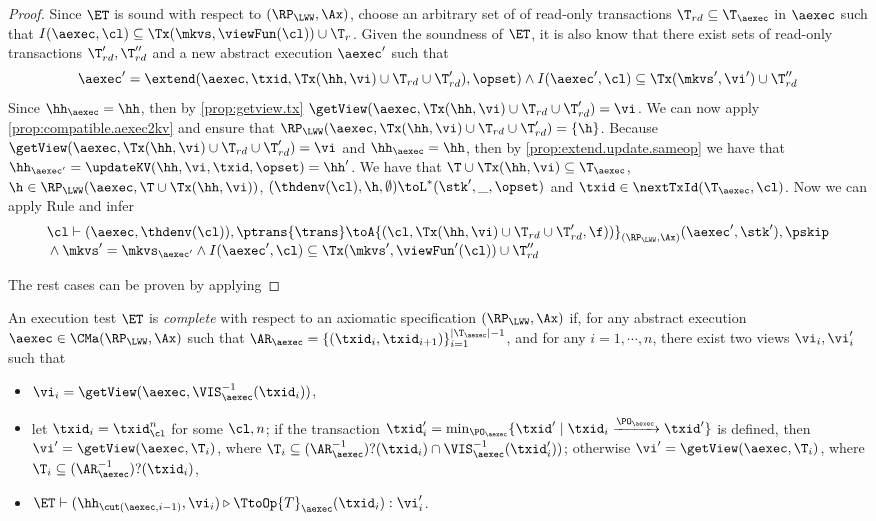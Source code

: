 \begin{proof}
Since \( \ET \) is sound with respect to \( (\RP_{\LWW}, \Ax) \),
choose an arbitrary set of of read-only transactions $\T_{rd} \subseteq \T_{\aexec}$ in \( \aexec \) such that \( I(\aexec, \cl) \subseteq \Tx(\mkvs, \viewFun(\cl)) \cup \T_{r}\).
Given the soundness of \( \ET \), it is also know that there exist sets of read-only transactions  \( \T'_{rd}, \T''_{rd} \) and a new abstract execution \( \aexec' \) such that 
\[
    \aexec' = \extend(\aexec, \txid, \Tx(\hh, \vi) \cup \T_{rd} \cup \T'_{rd} ), \opset)  \land I(\aexec', \cl)  \subseteq  \Tx(\mkvs', \vi') \cup \T''_{rd}
\]
Since $\hh_{\aexec} = \hh$, then by \cref{prop:getview.tx} $\getView(\aexec, \Tx(\hh, \vi) \cup \T_{rd} \cup \T'_{rd}) = \vi$. 
We can now apply \cref{prop:compatible.aexec2kv} and ensure that $\RP_{\LWW}(\aexec, \Tx(\hh, \vi) \cup \T_{rd} \cup \T'_{rd}) = \{\h\}$.
Because $\getView(\aexec, \Tx(\hh, \vi) \cup \T_{rd} \cup \T'_{rd}) = \vi$ and $\hh_{\aexec} = \hh$,
then by \cref{prop:extend.update.sameop} we have that $\hh_{\aexec'} = \updateKV(\hh, \vi, \txid, \opset) = \hh'$. 
We  have that $\T \cup \Tx(\hh, \vi) \subseteq \T_{\aexec}$, $\h \in \RP_{\LWW}(\aexec, \T \cup \Tx(\hh, \vi))$,
$(\thdenv(\cl), \h, \emptyset) \toL^{\ast} (\stk', \_, \opset)$ and $\txid \in \nextTxId(\T_{\aexec}, \cl)$. 
Now we can apply Rule  and infer
\[
\begin{array}{@{}l@{}}
    \cl \vdash (\aexec, \thdenv(\cl)), \ptrans{\trans} 
    \toA{(\cl, \Tx(\hh, \vi) \cup \T_{rd} \cup \T'_{rd}, \f))}_{(\RP_{\LWW}, \Ax)}  
    (\aexec', \stk'), \pskip \\
    {} \land \mkvs' = \mkvs_{\aexec'} 
    \land I(\aexec', \cl) \subseteq \Tx(\mkvs', \viewFun'(\cl)) \cup \T''_{rd} 
\end{array}
\]

The rest cases can be proven by applying \ih
\end{proof}


\begin{definition}
\label{def:et_complete}
An execution test $\ET$ is \emph{complete} with respect 
to an axiomatic specification $(\RP_{\LWW}, \Ax)$ if, for any 
abstract execution $\aexec \in \CMa(\RP_{\LWW}, \Ax)$ 
such that $\AR_{\aexec} = \{(\txid_{i}, \txid_{i+1})\}_{i=1}^{\lvert \T_{\aexec} \rvert - 1}$, 
and for any $i=1,\cdots, n$, there exist two views $\vi_{i}, \vi_{i}'$ such that 
\begin{itemize}
\item $\vi_{i} = \getView(\aexec, \VIS_{\aexec}^{-1}(\txid_{i}))$, 
\item let $\txid_{i} = \txid_{\cl}^{n}$ for some $\cl, n$; if the
transaction $\txid_{i}' = \min_{\PO_{\aexec}}\{\txid' \mid \txid_i \xrightarrow{\PO_{\aexec}} \txid'\}$  
is defined, then $\vi' = \getView(\aexec, \T_{i})$, where $\T_{i} \subseteq (\AR_{\aexec}^{-1})?(\txid_{i}) \cap \VIS_{\aexec}^{-1}(\txid_{i}'))$; 
otherwise $\vi' = \getView(\aexec, \T_{i})$, where $\T_{i} \subseteq (\AR_{\aexec}^{-1})?(\txid_{i})$, 
\item $\ET \vdash (\hh_{\cut(\aexec, i-1)}, \vi_{i}) \triangleright \TtoOp{T}_{\aexec}(\txid_{i}) : \vi_{i}'$.
\end{itemize}
\end{definition}

